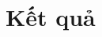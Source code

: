 \documentclass[../../main.tex]{subfiles}
\begin{document}
\graphicspath{{imgs/}{06_result/imgs/}}

\chapter{Kết quả}
\end{document}
